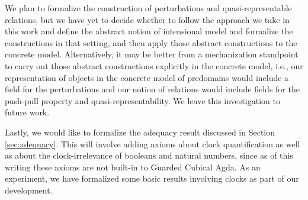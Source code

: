 We plan to formalize the construction of perturbations and 
quasi-representable relations, but we have yet to decide
whether to follow the approach we take in this work and define
the abstract notion of intensional model and formalize the constructions in that setting,
and then apply those abstract constructions to the concrete model.
Alternatively, it may be better from a mechanization standpoint
to carry out those abstract constructions explicitly in the concrete model,
i.e., our representation of objects in the concrete model of predomains
would include a field for the perturbations and our notion of relations
would include fields for the push-pull property and quasi-representability.
We leave this investigation to future work.

Lastly, we would like to formalize the adequacy result discussed in
Section \ref{sec:adequacy}. This will involve adding axioms about
clock quantification as well as about the clock-irrelevance of
booleans and natural numbers, since as of this writing these
axioms are not built-in to Guarded Cubical Agda. As an experiment, we have 
formalized some basic results involving clocks as part of our development.


